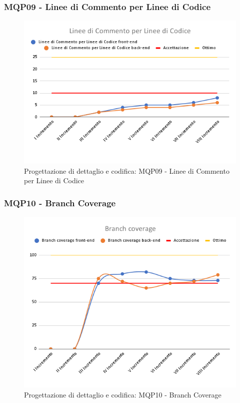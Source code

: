 \subsubsection{MQP09 - Linee di Commento per Linee di Codice}
\begin{figure}[H]
    \centering
    \includegraphics[scale=0.50]{Sezioni/images/pb_prodotto/Linee_di_Commento_per_Linee_di_Codice.png}
    \caption{Progettazione di dettaglio e codifica: MQP09 - Linee di Commento per Linee di Codice}
\end{figure}
\subsubsection{MQP10 - Branch Coverage}
\begin{figure}[H]
    \centering
    \includegraphics[scale=0.50]{Sezioni/images/pb_prodotto/Branch_coverage.png}
    \caption{Progettazione di dettaglio e codifica: MQP10 - Branch Coverage}
\end{figure}
